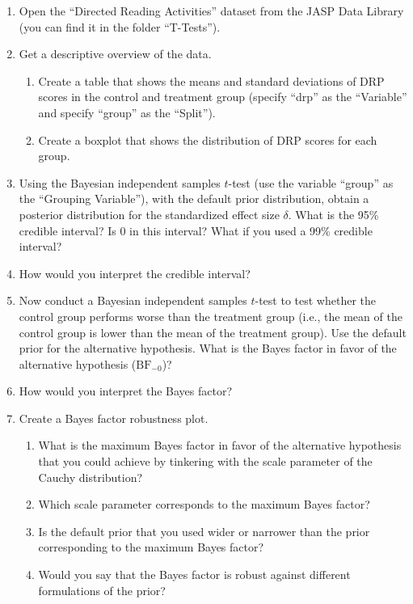 \documentclass[
]{book}
\providecommand{\tightlist}{%
  \setlength{\itemsep}{0pt}\setlength{\parskip}{0pt}}
\begin{document}
\begin{enumerate}
\def\labelenumi{\arabic{enumi}.}
\tightlist
\item
  Open the ``Directed Reading Activities'' dataset from the JASP Data Library
  (you can find it in the folder ``T-Tests'').
\item
  Get a descriptive overview of the data.

  \begin{enumerate}
  \def\labelenumii{\alph{enumii}.}
  \tightlist
  \item
    Create a table that shows the means and standard deviations of DRP scores in the control and treatment group (specify ``drp'' as the ``Variable'' and specify ``group'' as the ``Split'').
  \item
    Create a boxplot that shows the distribution of DRP scores for each group.
  \end{enumerate}
\item
  Using the Bayesian independent samples \(t\)-test (use the variable ``group'' as the ``Grouping Variable''), with the default prior distribution, obtain a posterior distribution for the standardized effect size \(\delta\). What is the 95\% credible interval? Is 0 in this interval? What if you used a 99\% credible interval?
\item
  How would you interpret the credible interval?
\item
  Now conduct a Bayesian independent samples \(t\)-test to test whether the control group performs worse than the treatment group (i.e., the mean of the control group is lower than the mean of the treatment group). Use the default prior for the alternative hypothesis. What is the Bayes factor in favor of the alternative hypothesis (\(\text{BF}_{-0}\))?
\item
  How would you interpret the Bayes factor?
\item
  Create a Bayes factor robustness plot.

  \begin{enumerate}
  \def\labelenumii{\alph{enumii}.}
  \tightlist
  \item
    What is the maximum Bayes factor in favor of the alternative hypothesis that you could achieve by tinkering with the scale parameter
    of the Cauchy distribution?
  \item
    Which scale parameter corresponds to the maximum Bayes factor?
  \item
    Is the default prior that you used wider or narrower than the prior corresponding to the maximum Bayes factor?
  \item
    Would you say that the Bayes factor is robust against different formulations of the prior?
  \end{enumerate}
\end{enumerate}
\end{document}

